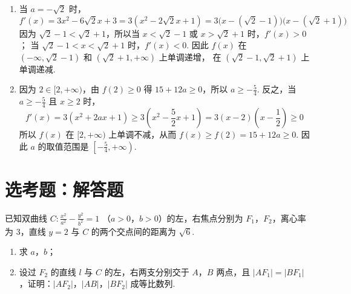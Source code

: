 \begin{solution}
\begin{enumerate}
\item 当 \(a=-\sqrt{2}\) 时，
\[
f'(x)=3x^2-6\sqrt{2}x+3
=3(x^2-2\sqrt{2}x+1)
=3\bigl(x-(\sqrt{2}-1)\bigr)\bigl(x-(\sqrt{2}+1)\bigr)
\]
因为 \(\sqrt{2}-1<\sqrt{2}+1\)，所以当 \(x<\sqrt{2}-1\) 或 \(x>\sqrt{2}+1\) 时，\(f'(x)>0\)；
当 \(\sqrt{2}-1<x<\sqrt{2}+1\) 时，\(f'(x)<0\).
因此 \(f(x)\) 在 \((-\infty,\sqrt{2}-1)\) 和 \((\sqrt{2}+1,+\infty)\) 上单调递增，
在 \((\sqrt{2}-1,\sqrt{2}+1)\) 上单调递减.

\item 因为 \(2\in[2,+\infty)\)，由 \(f(2)\geqslant0\) 得 \(15+12a\geqslant0\)，所以 \(a\geqslant-\frac{5}{4}\).
反之，当 \(a\geqslant-\frac{5}{4}\) 且 \(x\geqslant2\) 时，
\[
f'(x)=3(x^2+2ax+1)\geqslant3\left(x^2-\frac{5}{2}x+1\right)=3(x-2)\left(x-\frac{1}{2}\right)\geqslant0
\]
所以 \(f(x)\) 在 \([2,+\infty)\) 上单调不减，从而 \(f(x)\geqslant f(2)=15+12a\geqslant0\).
因此 \(a\) 的取值范围是 \(\left[-\frac{5}{4},+\infty\right)\).
\end{enumerate}
\end{solution}

\section{选考题：解答题}

\begin{problem}
已知双曲线 \(C: \frac{x^2}{a^2} - \frac{y^2}{b^2} = 1 \) （\(a > 0\)，\(b > 0\)）的左，右焦点分别为 \(F_1\)，\(F_2\)，离心率为 3，直线 \(y = 2\) 与 \(C\) 的两个交点间的距离为 \(\sqrt{6}\).

\begin{enumerate}
\item 求 \(a\)，\(b\)；
\item 设过 \(F_{2}\) 的直线 \(l\) 与 \(C\) 的左，右两支分别交于 \(A\)，\(B\) 两点，且 \(|AF_{1}| = |BF_{1}|\)，证明：\(|AF_{2}|\)，\(|AB|\)，\(|BF_{2}|\) 成等比数列.
\end{enumerate}
\end{problem}

